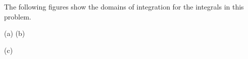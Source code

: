 \begin{solution}
The following figures show the domains of integration for the
integrals in this problem.

\begin{center}
  (a)  \qquad
  (b)  
\end{center}
\begin{center}
  (c)      \end{center}


\end{solution}

